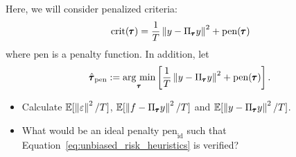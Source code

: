 \documentclass[11pt]{article}
\begin{document}
Here, we will consider penalized criteria:
\begin{equation}
    \text{crit}(\pmb{\tau}) = \frac{1}{T}\left\lVert y - \Pi_{\pmb{\tau}}y\right\rVert^2 + \text{pen}(\pmb{\tau})
\end{equation}
where $\text{pen}$ is a penalty function.
In addition, let 
\begin{equation}
    \hat{\pmb{\tau}}_{\text{pen}} := \operatorname*{\mbox{arg min}}_{\pmb{\tau}} \left[ \frac{1}{T}\left\lVert y - \Pi_{\pmb{\tau}}y\right\rVert^2 + \text{pen}(\pmb{\tau})\right].
\end{equation}

\newpage
\begin{exercise}[subtitle=Ideal penalty]
\begin{itemize}
    \item Calculate $\mathbb{E}[\left\lVert\varepsilon\right\rVert^2/T]$, $\mathbb{E}[\left\lVert f - \Pi_{\pmb{\tau}}y\right\rVert^2/T]$ and $\mathbb{E}[\left\lVert y - \Pi_{\pmb{\tau}}y\right\rVert^2/T]$.
    \item What would be an ideal penalty $\text{pen}_{\text{id}}$ such that Equation~\eqref{eq:unbiased_risk_heuristics} is verified?
\end{itemize}

\end{exercise}
\end{document}

